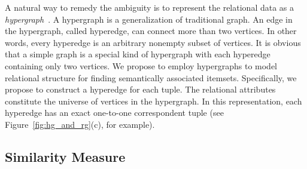 A natural way to remedy the ambiguity is to represent the relational data as a \emph{hypergraph}~\cite{Hypergraph}. A hypergraph is a generalization of traditional graph. An edge in the hypergraph, called hyperedge, can connect more than two vertices. In other words, every hyperedge is an arbitrary nonempty subset of vertices. It is obvious that a simple graph is a special kind of hypergraph with each hyperedge containing only two vertices. We propose to employ hypergraphs to model relational structure for finding semantically associated itemsets. Specifically, we propose to construct a hyperedge for each tuple. The relational attributes constitute the universe of vertices in the hypergraph. In this representation, each hyperedge has an exact one-to-one correspondent tuple (see Figure~\ref{fig:hg_and_rg}(c), for example).

\subsection{Similarity Measure}


